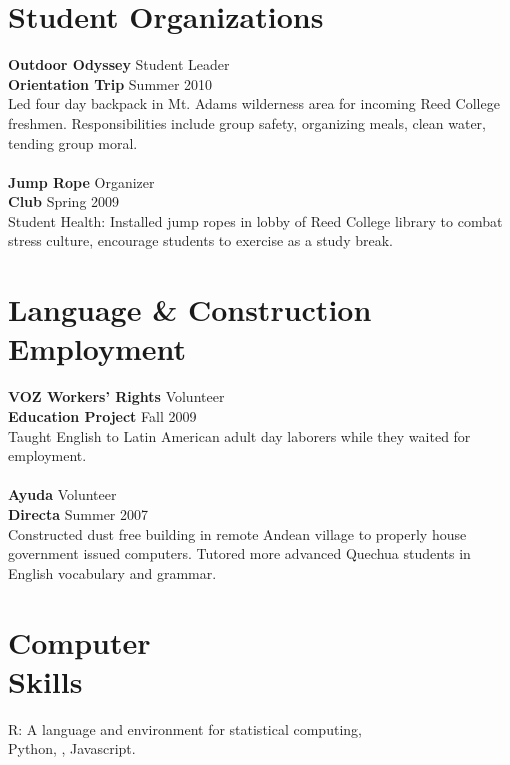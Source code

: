 \documentclass[margin,line]{resume}
\begin{document}
\begin{resume}
\section{\mysidestyle Student Organizations }

\textbf{Outdoor Odyssey} \hfill Student Leader \\
\textbf{Orientation Trip} \hfill Summer 2010 \\
Led four day backpack in Mt. Adams wilderness area for incoming Reed College freshmen. Responsibilities include group safety, organizing meals, clean water, tending group moral.
\\\vspace{-2mm}\\
\textbf{Jump Rope} \hfill Organizer
\\\textbf{Club}  \hfill Spring 2009\\
Student Health: Installed jump ropes in lobby of Reed College library to combat stress culture, encourage students to exercise as a study break. 

	\section{\mysidestyle Language \& Construction \\ Employment}
\textbf{VOZ Workers' Rights}  \hfill Volunteer \\ \textbf{Education Project} \hfill Fall 2009 \\ Taught English to Latin American adult day laborers while they waited for employment. \\
\vspace{-2mm}\\    
\textbf{Ayuda} \hfill Volunteer \\    
\textbf{Directa} \hfill Summer 2007	\\
Constructed dust free building in remote Andean village to properly house government issued computers. Tutored more advanced Quechua students in English vocabulary and grammar.    


    \section{\mysidestyle Computer\\Skills}
 R: A language and environment for statistical computing, \\ Python, \LaTeXe,  Javascript.

\end{resume}
\end{document}
